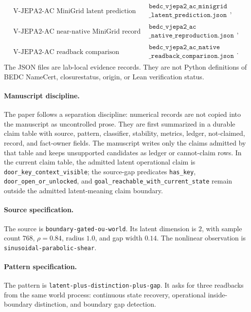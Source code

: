 {$$\begin{array}{ll}
\text{V-JEPA2-AC MiniGrid latent prediction} &
\begin{array}{l}\texttt{bedc\_vjepa2\_ac\_minigrid}\\\texttt{\_latent\_prediction.json}\end{array},\\
\text{V-JEPA2-AC near-native MiniGrid record} &
\begin{array}{l}\texttt{bedc\_vjepa2\_ac}\\\texttt{\_native\_reproduction.json}\end{array},\\
\text{V-JEPA2-AC readback comparison} &
\begin{array}{l}\texttt{bedc\_vjepa2\_ac\_native}\\\texttt{\_readback\_comparison.json}\end{array}.
\end{array}
$$
}
The JSON files are lab-local evidence records.  They are not Python
definitions of BEDC NameCert, closurestatus, origin, or Lean verification
status.

\paragraph{Manuscript discipline.}
The paper follows a separation discipline: numerical records are not copied
into the manuscript as uncontrolled prose.  They are first summarized in a
durable claim table with source, pattern, classifier, stability, metrics,
ledger, not-claimed, record, and fact-owner fields.  The manuscript writes
only the claims admitted by that table and
keeps unsupported candidates as ledger or cannot-claim rows.  In the current
claim table, the admitted latent operational claim is
\texttt{door\_key\_context\_visible}; the source-gap predicates
\texttt{has\_key}, \texttt{door\_open\_or\_unlocked}, and
\texttt{goal\_reachable\_with\_current\_state} remain outside the admitted
latent-meaning claim boundary.

\paragraph{Source specification.}
The source is \texttt{boundary-gated-ou-world}.  Its latent dimension is $2$,
with sample count $768$, $\rho=0.84$, radius $1.0$, and gap width $0.14$.
The nonlinear observation is \texttt{sinusoidal-parabolic-shear}.

\paragraph{Pattern specification.}
The pattern is \texttt{latent-plus-distinction-plus-gap}.  It asks for three
readbacks from the same world process: continuous state recovery, operational
inside-boundary distinction, and boundary gap detection.

